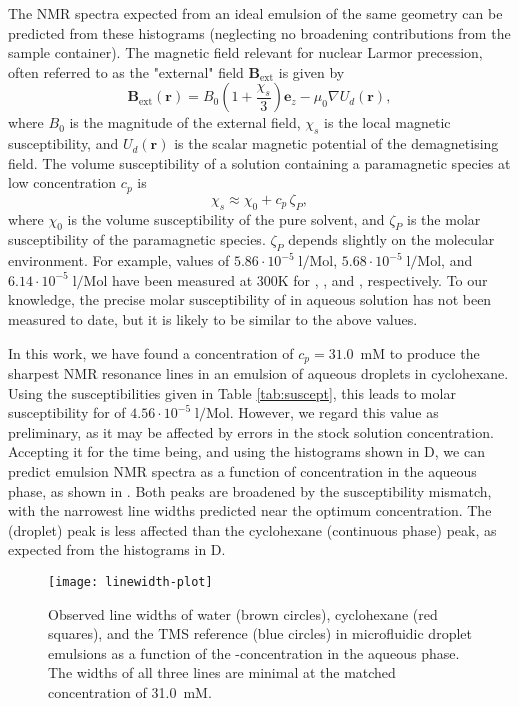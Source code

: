 The NMR spectra expected from an ideal emulsion of the same geometry can
be predicted from these histograms
(neglecting no broadening contributions from the sample container).
The magnetic field relevant for nuclear Larmor precession, often referred
to as the "external" field\cite{Levitt:1996tg} $\mathbf{B}_\text{ext}$  is
given by\cite{Ryan:2014hl}
\[
\mathbf{B}_\text{ext}(\mathbf{r})
= B_0 (1+\frac{\chi_s}{3}) \mathbf{e}_z  - {\mu_0} \nabla U_d(\mathbf{r}),
\]
where $B_0$ is the magnitude of the external field, $\chi_s$ is the local
magnetic susceptibility, and $U_d(\mathbf{r})$ is the scalar magnetic potential
of the demagnetising field. The volume susceptibility of a solution containing a
paramagnetic species at low concentration $c_p$ is
\[
    \chi_s \approx \chi_0 + c_p\,\zeta_P,
\]
where $\chi_0$ is the volume susceptibility of the pure solvent,
and $\zeta_P$ is the
molar susceptibility of the paramagnetic species. $\zeta_P$ depends
slightly on the molecular environment. For example, values of
$5.86\cdot 10^{-5}\;\mathrm{l/\text{Mol}}$,
$5.68\cdot 10^{-5}\;\mathrm{l/\text{Mol}}$, and
$6.14\cdot 10^{-5}\;\mathrm{l/\text{Mol}}$ have been measured at 300K for
, , and , respectively.\cite{Takikawa:2010iw}
To our knowledge, the precise molar susceptibility of  in
aqueous solution has not been measured to date, but it is likely to be
similar to the above values.

In this work, we have found a  concentration of $c_p=31.0$~mM
to produce the sharpest NMR resonance lines in an emulsion of aqueous droplets
in cyclohexane. Using the susceptibilities given in
Table \ref{tab:suscept}, this leads to molar susceptibility for 
of $4.56\cdot 10^{-5}\;\mathrm{l/\text{Mol}}$. However, we regard this
value as preliminary, as it may be affected by errors in the 
stock solution concentration. Accepting it for the time being,
and using the histograms shown in D,
we can predict emulsion NMR
spectra as a function of  concentration in the aqueous phase,
as shown in . Both peaks are broadened by the
susceptibility mismatch, with the narrowest line widths predicted near the
optimum concentration. The  (droplet) peak is less affected than
the cyclohexane (continuous phase) peak, as expected from the histograms
in D.

\begin{figure}
  \begin{center}
    \texttt{[image: linewidth-plot]}
  \end{center}
  \caption{Observed line widths of water (brown circles),
    cyclohexane (red squares), and the TMS
    reference (blue circles) in microfluidic droplet emulsions
    as a function of the -concentration in the aqueous phase.
    The widths of all three lines are minimal
    at the matched concentration of 31.0~mM.}
    \label{fig:linewidths}
\end{figure}

